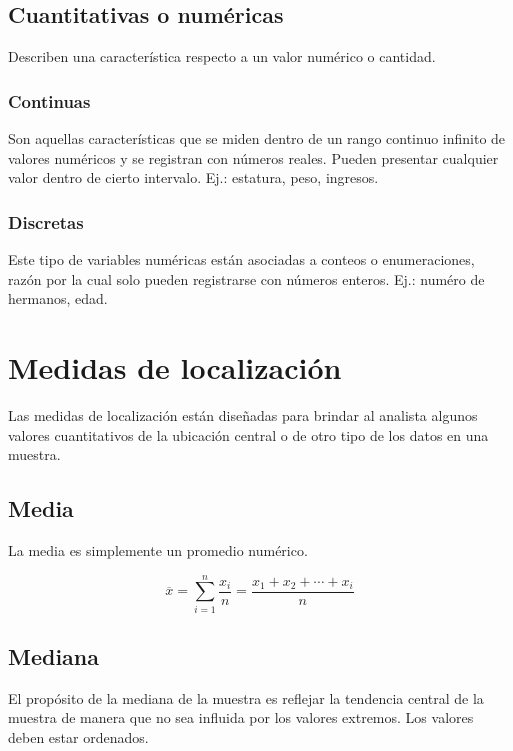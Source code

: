 \documentclass{report}
\begin{document}
      \subsection*{Cuantitativas o numéricas}
        Describen una característica respecto a un valor numérico o cantidad.

        \subsubsection*{Continuas}
          Son aquellas características que se miden dentro de un rango continuo 
          infinito de valores numéricos y se registran con números reales. Pueden 
          presentar cualquier valor dentro de cierto intervalo. Ej.: estatura, 
          peso, ingresos.
        \subsubsection*{Discretas}
          Este tipo de variables numéricas están asociadas a conteos o enumeraciones, 
          razón por la cual solo pueden registrarse con números enteros. Ej.: numéro
          de hermanos, edad.
    \section*{Medidas de localización}
      Las medidas de localización están diseñadas para brindar al analista algunos 
      valores cuantitativos de la ubicación central o de otro tipo de los datos en una 
      muestra.
      
      \subsection*{Media}
        La media es simplemente un promedio numérico.

        \begin{equation*}
          \overline{x}=\sum_{i = 1}^n\frac{x_i}{n}=\frac{x_1+x_2+\dotsm+x_i}{n}
        \end{equation*}

        \subsection*{Mediana}
          El propósito de la mediana de la muestra es reflejar la tendencia central 
          de la muestra de manera que no sea influida por los valores extremos. Los
          valores deben estar ordenados.\\
       
\end{document}
